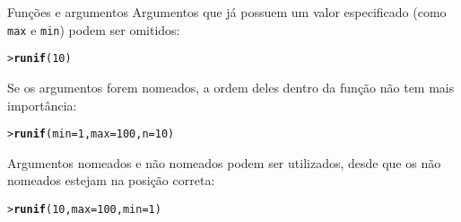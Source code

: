 \documentclass[10pt,handout]{beamer}\usepackage{graphicx, color}
\makeatletter
\newcommand{\hlfunctioncall}[1]{\textcolor[rgb]{0,0,0.545098039215686}{\textbf{#1}}}%
\newenvironment{kframe}{%
 \def\at@end@of@kframe{}%
 \ifinner\ifhmode%
  \def\at@end@of@kframe{\end{minipage}}%
  \begin{minipage}{\columnwidth}%
 \fi\fi%
 \def\FrameCommand##1{\hskip\@totalleftmargin \hskip-\fboxsep
 \colorbox{shadecolor}{##1}\hskip-\fboxsep
     \hskip-\linewidth \hskip-\@totalleftmargin \hskip\columnwidth}%
 \MakeFramed {\advance\hsize-\width
   \@totalleftmargin\z@ \linewidth\hsize
   \@setminipage}}%
 {\par\unskip\endMakeFramed%
 \at@end@of@kframe}
\newenvironment{knitrout}{}{} %
\makeatother
\begin{document}
\begin{frame}[fragile=singleslide]{Funções e argumentos}
Argumentos que já possuem um valor especificado (como \texttt{max} e
\texttt{min}) podem ser omitidos:
\begin{knitrout}\small
{}\color{fgcolor}\begin{kframe}
\begin{alltt}
> \hlfunctioncall{runif}(10)
\end{alltt}
\end{kframe}
\end{knitrout}

Se os argumentos forem nomeados, a ordem deles dentro da função não tem
mais importância:
\begin{knitrout}\small
{}\color{fgcolor}\begin{kframe}
\begin{alltt}
> \hlfunctioncall{runif}(min = 1, max = 100, n = 10)
\end{alltt}
\end{kframe}
\end{knitrout}

Argumentos nomeados e não nomeados podem ser utilizados, desde que os
não nomeados estejam na posição correta:
\begin{knitrout}\small
{}\color{fgcolor}\begin{kframe}
\begin{alltt}
> \hlfunctioncall{runif}(10, max = 100, min = 1)
\end{alltt}
\end{kframe}
\end{knitrout}

\end{frame}
\end{document}
